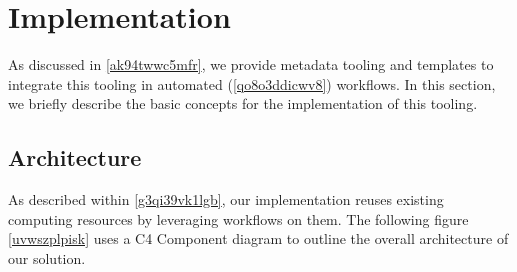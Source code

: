 \documentclass{article}
\begin{document}
\section{Implementation}\label{d9jafc0bwx8g}
As discussed in \ref{ak94twwc5mfr}, we provide metadata tooling and templates to integrate this tooling in automated (\ref{qo8o3ddicwv8}) workflows. In this section, we briefly describe the basic concepts for the implementation of this tooling.



\subsection{Architecture}\label{ichz44bq6tfo}
As described within \ref{g3qi39vk1lgb}, our implementation reuses existing computing resources by leveraging workflows on them. The following figure \ref{uvwszplpisk} uses a C4 Component diagram to outline the overall architecture of our solution.
\end{document}

